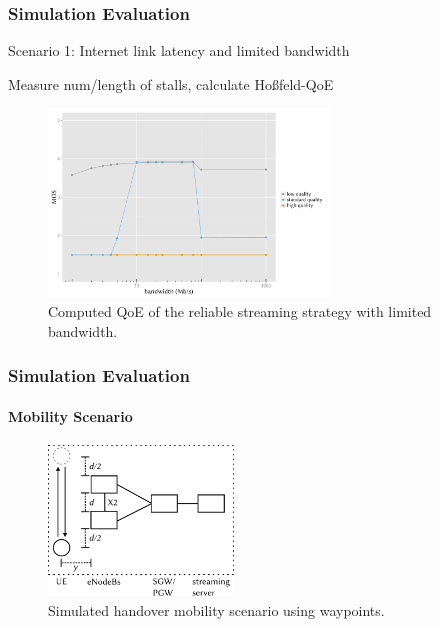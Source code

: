\documentclass{beamer}
\begin{document}
\begin{frame}
	\frametitle{Simulation Evaluation}

	Scenario 1: Internet link latency and limited bandwidth

	Measure num/length of stalls, calculate Hoßfeld-QoE

	\begin{figure}
	\centering
	\includegraphics[height=5cm]{../../chapters/06-mobilestreamingmeasurements/images/R-ltesim-bwseries-qoe.pdf}
	\caption{Computed QoE of the reliable streaming strategy with limited bandwidth.}
	\end{figure}

\end{frame}



\begin{frame}
	\frametitle{Simulation Evaluation}
	\framesubtitle{Mobility Scenario}

	\begin{figure}
		\includegraphics[height=4cm]{../../chapters/06-mobilestreamingmeasurements/images/streaming-simulation-mobility.pdf}
		\caption{Simulated handover mobility scenario using waypoints.}
	\end{figure}

\end{frame}
\end{document}
